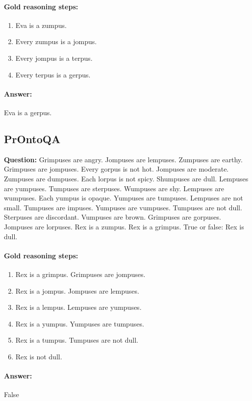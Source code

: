 \documentclass[11pt]{article}
\begin{document}
\paragraph{Gold reasoning steps:}
\begin{enumerate}
\item Eva is a zumpus.
\item Every zumpus is a jompus.
\item Every jompus is a terpus.
\item Every terpus is a gerpus.
\end{enumerate}

\paragraph{Answer:} Eva is a gerpus.

\subsection{PrOntoQA}

\textbf{Question:} Grimpuses are angry. Jompuses are lempuses. Zumpuses are earthy. Grimpuses are jompuses. Every gorpus is not hot. Jompuses are moderate. Zumpuses are dumpuses. Each lorpus is not spicy. Shumpuses are dull. Lempuses are yumpuses. Tumpuses are sterpuses. Wumpuses are shy. Lempuses are wumpuses. Each yumpus is opaque. Yumpuses are tumpuses. Lempuses are not small. Tumpuses are impuses. Yumpuses are vumpuses. Tumpuses are not dull. Sterpuses are discordant. Vumpuses are brown. Grimpuses are gorpuses. Jompuses are lorpuses. Rex is a zumpus. Rex is a grimpus. True or false: Rex is dull.

\paragraph{Gold reasoning steps:}
\begin{enumerate}
\item Rex is a grimpus. Grimpuses are jompuses.
\item Rex is a jompus. Jompuses are lempuses.
\item Rex is a lempus. Lempuses are yumpuses.
\item Rex is a yumpus. Yumpuses are tumpuses.
\item Rex is a tumpus. Tumpuses are not dull.
\item Rex is not dull.
\end{enumerate}

\paragraph{Answer:} False
\end{document}
